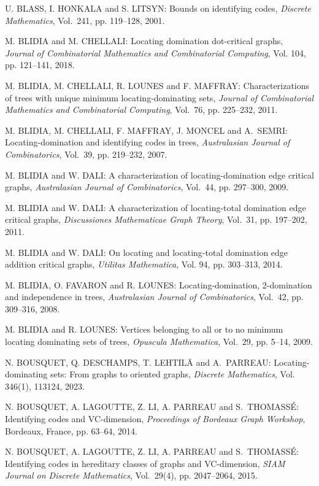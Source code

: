 \begin{thebibliography}{999}
U. BLASS, I. HONKALA and S. LITSYN: Bounds on identifying codes, {\it Discrete Mathematics}, Vol.~241, pp. 119--128, 2001.

M. BLIDIA and M. CHELLALI: Locating domination dot-critical graphs, {\it Journal of Combinatorial Mathematics and Combinatorial Computing}, Vol. 104, pp. 121--141, 2018.

M. BLIDIA, M. CHELLALI, R. LOUNES and F. MAFFRAY: Characterizations of trees with unique minimum locating-dominating sets, {\it Journal of Combinatorial Mathematics and Combinatorial Computing}, Vol.~76, pp. 225--232, 2011.

M. BLIDIA, M. CHELLALI, F. MAFFRAY, J. MONCEL and A.~SEMRI: Locating-domination and identifying codes in trees, {\it Australasian Journal of Combinatorics}, Vol.~39, pp. 219--232, 2007.

M. BLIDIA and W. DALI: A characterization of locating-domination edge critical graphs, {\it Australasian Journal of Combinatorics}, Vol.~44, pp. 297--300, 2009.

M. BLIDIA and W. DALI: A characterization of locating-total domination edge critical graphs, {\it Discussiones Mathematicae Graph Theory}, Vol.~31, pp. 197--202, 2011.

M. BLIDIA and W. DALI:
On locating and locating-total domination edge addition critical graphs,
{\it Utilitas Mathematica}, Vol. 94, pp. 303--313, 2014.

M. BLIDIA, O. FAVARON and R. LOUNES: Locating-domination, 2-domination and
independence in trees, {\it Australasian Journal of Combinatorics}, Vol.~42, pp.
309--316, 2008. 

M. BLIDIA and R. LOUNES: Vertices belonging to all or to no minimum locating dominating sets of trees, {\it Opuscula Mathematica}, Vol.~29, pp. 5--14, 2009.

N. BOUSQUET, Q. DESCHAMPS, T. LEHTIL\"A and A.~PARREAU: Locating-dominating sets: {F}rom graphs to oriented graphs, {\it Discrete Mathematics}, Vol. 346(1), 113124, 2023. 

N. BOUSQUET, A. LAGOUTTE, Z. LI, A. PARREAU and S.~THO\-MASS\'E: Identifying codes and VC-dimension, {\it Proceedings of Bordeaux Graph Workshop}, Bordeaux, France, pp. 63--64, 2014.

N. BOUSQUET, A. LAGOUTTE, Z. LI, A. PARREAU and S.~THO\-MASS\'E: Identifying codes in hereditary classes of graphs and VC-dimension, {\it SIAM Journal on Discrete Mathematics}, Vol.~29(4), pp. 2047--2064, 2015.


\end{thebibliography}
